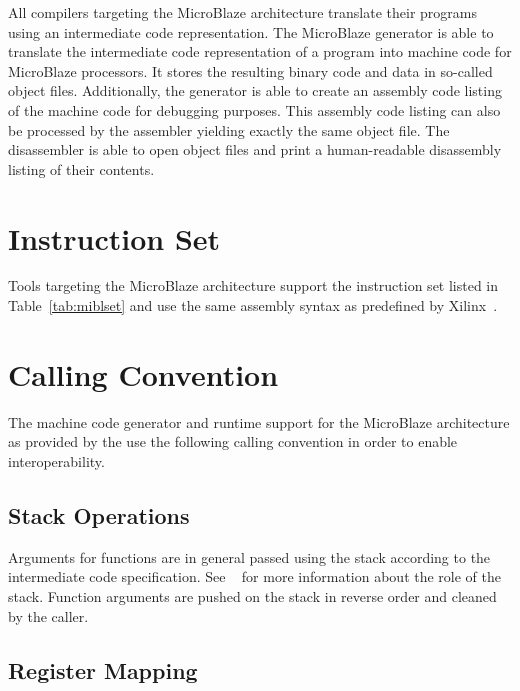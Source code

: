 All compilers targeting the MicroBlaze architecture translate their programs using an intermediate code representation.
The MicroBlaze generator is able to translate the intermediate code representation of a program into machine code for MicroBlaze processors.
It stores the resulting binary code and data in so-called object files.
Additionally, the generator is able to create an assembly code listing of the machine code for debugging purposes.
This assembly code listing can also be processed by the assembler yielding exactly the same object file.
The disassembler is able to open object files and print a human-readable disassembly listing of their contents.
\seeobject\seecode

\section{Instruction Set}

Tools targeting the MicroBlaze architecture support the instruction set listed in Table~\ref{tab:miblset} and use the same assembly syntax as predefined by Xilinx~\cite{mibl:instructionset}.
\seeassembly


\section{Calling Convention}

The machine code generator and runtime support for the MicroBlaze architecture as provided by the \ecs{} use the following calling convention in order to enable interoperability.

\subsection{Stack Operations}

Arguments for functions are in general passed using the stack according to the intermediate code specification.
See \Documentation{}~ for more information about the role of the stack.
Function arguments are pushed on the stack in reverse order and cleaned by the caller.

\subsection{Register Mapping}

